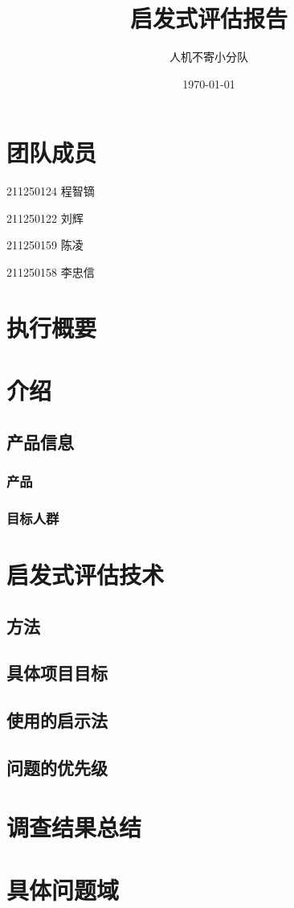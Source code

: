 \documentclass[a4paper,12pt]{article}
\title{启发式评估报告}
\author{人机不寄小分队}
\date{\today}
\begin{document}
    \maketitle

    \tableofcontents

    \section{团队成员}
    211250124 程智镝

    211250122 刘辉

    211250159 陈凌

    211250158 李忠信
    \section{执行概要}

    \section{介绍}
    \subsection{产品信息}
    \subsubsection{产品}
    \subsubsection{目标人群}

    \section{启发式评估技术}
    \subsection{方法}
    \subsection{具体项目目标}
    \subsection*{使用的启示法}
    \subsection*{问题的优先级}
    
    \section*{调查结果总结}

    \section*{具体问题域}
\end{document}
